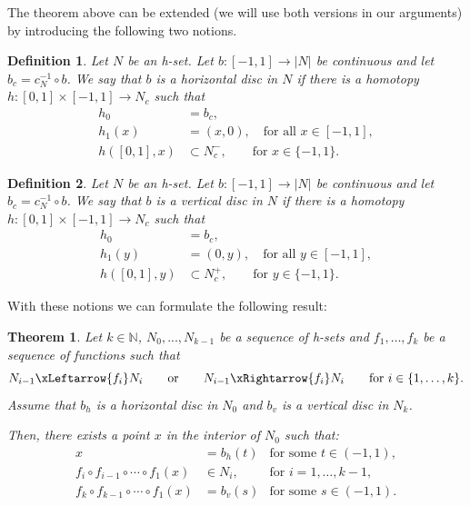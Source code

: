 \documentclass[1p]{article}
\newtheorem{definition}{Definition}
\newtheorem{theorem}{Theorem}
\begin{document}
The theorem above can be extended (we will use both versions in our arguments) by introducing the following two notions.
\begin{definition}\label{def:horizontal-disc} Let $N$ be an h-set. Let $b:[-1,1]\to |N|$ be continuous and let $b_c=c_N^{-1}\circ b$. We say that $b$ is a {\em horizontal disc} in $N$ if there is a homotopy $h:[0,1]\times[-1,1]\to N_c$ such that
\begin{align*}
	h_0&=b_c, \\
	h_1(x)& = (x,0), \quad \mbox{for all }x\in [-1,1], \\
	h([0,1],x)&\subset N_c^-, \qquad \mbox{for }x\in\{-1,1\}.
\end{align*}
\end{definition}
\begin{definition}\label{def:vertical-disc} Let $N$ be an h-set. Let $b:[-1,1]\to |N|$ be continuous and let $b_c=c_N^{-1}\circ b$. We say that $b$ is a {\em vertical disc} in $N$ if there is a homotopy $h:[0,1]\times[-1,1]\to N_c$ such that
\begin{align*}
	h_0&=b_c, \\
	h_1(y)& = (0,y), \quad \mbox{for all }y\in [-1,1], \\
	h([0,1],y)&\subset N_c^+, \qquad \mbox{for }y\in\{-1,1\}.
\end{align*}
\end{definition}
With these notions we can formulate the following result:
\begin{theorem}\cite{MR2494688}
    \label{thm:cover-discs}
    Let $k \in \mathbb{N}$, $N_0, ..., N_{k-1}$ be a sequence of h-sets and $f_{1}, \dots, f_{k}$ be a sequence of functions such that
    \[
    	N_{i-1} \xLeftarrow{f_i} N_{i} \qquad \mbox{or} \qquad N_{i-1} \xRightarrow{f_i} N_{i} \qquad \mbox{for }i\in\{1,\ldots,k\}.
    \]
    Assume that $b_h$ is a horizontal disc in $N_0$ and $b_v$ is a vertical disc in $N_k$.
    
    Then, there exists a point $x$ in the interior of $N_0$ such that:
    \begin{align*}
    	x&=b_h(t) &\mbox{for some }t\in (-1,1), \\
	    f_{i}\circ f_{i-1}\circ\cdots\circ f_{1}(x) &\in N_i, &\mbox{for }i=1,\ldots,k-1,\,\,\, \\
	    f_{k}\circ f_{k-1}\circ\cdots\circ f_{1}(x)&=b_v(s) &\mbox{for some }s\in(-1,1).
    \end{align*}
  
\end{theorem}
\end{document}
